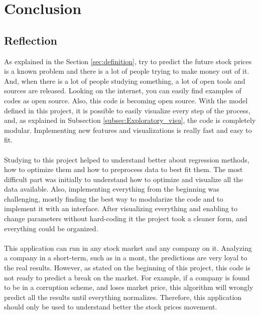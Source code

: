 \section{Conclusion}
\label{sec:conclusion}




\subsection{Reflection}
As explained in the Section \ref{sec:definition}, try to predict the future stock prices is a known problem and there is a lot of people trying to make money out of it. And, when there is a lot
of people studying something, a lot of open tools and sources are released. Looking on the internet, you can easily find examples of codes as open source. Also, this code is becoming open source.
With the model defined in this project, it is possible to easily visualize every step of the process, and, as explained in Subsection \ref{subsec:Exploratory_visu}, the code is completely modular.
Implementing new features and visualizations is really fast and easy to fit.\\
\\
Studying to this project helped to understand better about regression methods, how to optimize them and how to preprocess data to best fit them. The most difficult part was initially to understand
how to optimize and visualize all the data available. Also, implementing everything from the beginning was challenging, mostly finding the best way to modularize the code and to implement it with 
an interface. After visualizing everything and enabling to change parameters without hard-coding it the project took a cleaner form, and everything could be organized.\\
\\
This application can run in any stock market and any company on it. Analyzing a company in a short-term, such as in a mont, the predictions are very loyal to the real results. However, as stated on
the beginning of this project, this code is not ready to predict a break on the market. For example, if a company is found to be in a corruption scheme, and loses market price, this algorithm will 
wrongly predict all the results until everything normalizes. Therefore, this application should only be used to understand better the stock prices movement. 

